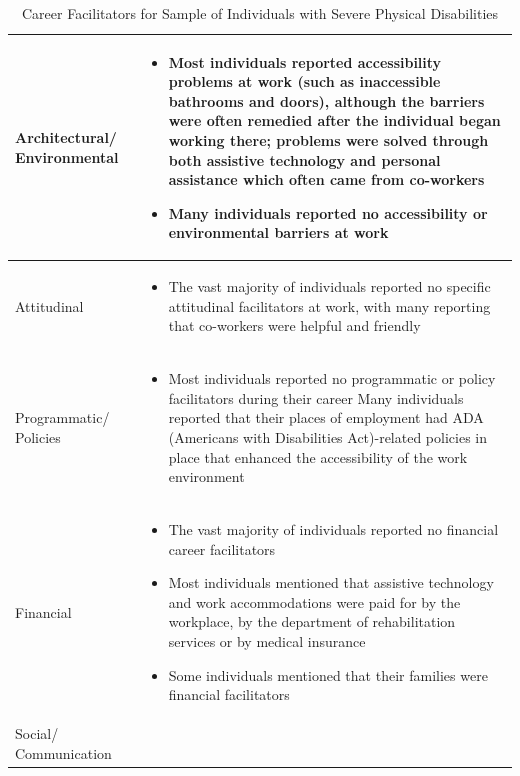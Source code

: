 \documentclass[11.5pt]{sig-alternate} %
\begin{document}
\begin{large}
\begin{table}[th]
\caption{Career Facilitators for Sample of Individuals with Severe Physical Disabilities}
\begin{tabular}{|l|l|}
\hline
Architectural/ Environmental & 
\begin{itemize}[noitemsep, topsep=0pt, leftmargin=*]
\item Most individuals reported accessibility problems at work (such as inaccessible bathrooms and doors), although the barriers were often remedied after the individual began working there; problems were solved through both assistive technology and personal assistance which often came from co-workers
\item Many individuals reported no accessibility or environmental barriers at work
\end{itemize} \\ \hline
Attitudinal &
\begin{itemize}[noitemsep, topsep=0pt, leftmargin=*]
\item The vast majority of individuals reported no specific attitudinal facilitators at work, with many reporting that co-workers were helpful and friendly
\end{itemize} \\ \hline
Programmatic/ Policies &
\begin{itemize}[noitemsep, topsep=0pt, leftmargin=*]
\item Most individuals reported no programmatic or policy facilitators during their career Many individuals reported that their places of employment had ADA (Americans with Disabilities Act)-related policies in place that enhanced the accessibility of the work environment
\end{itemize} \\ \hline
Financial &
\begin{itemize}[noitemsep, topsep=0pt, leftmargin=*]
\item The vast majority of individuals reported no financial career facilitators
\item Most individuals mentioned that assistive technology and work accommodations were paid for by the workplace, by the department of rehabilitation services or by medical insurance
\item Some individuals mentioned that their families were financial facilitators
\end{itemize} \\ \hline
Social/ Communication &
\begin{itemize}[noitemsep, topsep=0pt, leftmargin=*]

\end{itemize}
\end{tabular}
\end{table}
\end{large}
\end{document}
